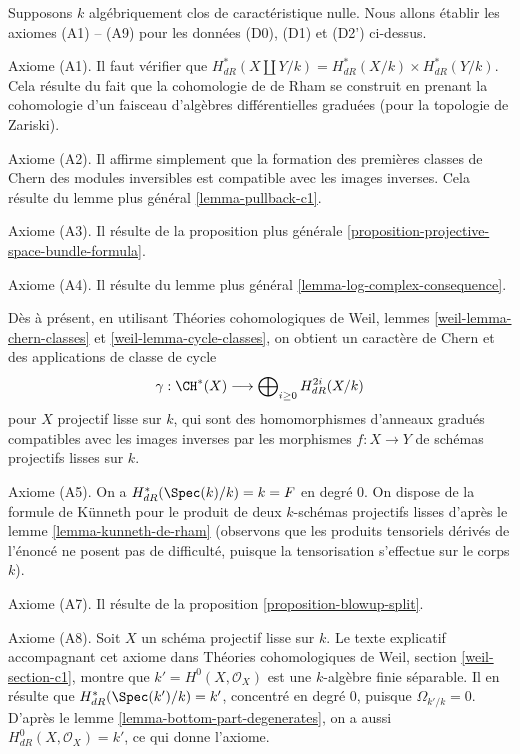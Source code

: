 \medskip\noindent
Supposons $k$ algébriquement clos de caractéristique nulle.
Nous allons établir les axiomes (A1) -- (A9) pour les données (D0), (D1) et (D2')
ci-dessus.

\medskip\noindent
Axiome (A1). Il faut vérifier que
$H^*_{dR}(X \coprod Y/k) =  H^*_{dR}(X/k) \times H^*_{dR}(Y/k)$.
Cela résulte du fait que la cohomologie de de Rham
se construit en prenant la cohomologie d'un faisceau d'algèbres différentielles
graduées (pour la topologie de Zariski).

\medskip\noindent
Axiome (A2). Il affirme simplement que la formation des premières classes
de Chern des modules inversibles est compatible avec les images inverses.
Cela résulte du lemme plus général \ref{lemma-pullback-c1}.

\medskip\noindent
Axiome (A3). Il résulte de la proposition
plus générale \ref{proposition-projective-space-bundle-formula}.

\medskip\noindent
Axiome (A4). Il résulte du lemme
plus général \ref{lemma-log-complex-consequence}.

\medskip\noindent
Dès à présent, en utilisant
Théories cohomologiques de Weil, lemmes \ref{weil-lemma-chern-classes} et
\ref{weil-lemma-cycle-classes}, on obtient un caractère de Chern et des
applications de classe de cycle
$$
\gamma :
\CH^*(X)
\longrightarrow
\bigoplus\nolimits_{i \geq 0} H^{2i}_{dR}(X/k)
$$
pour $X$ projectif lisse sur $k$, qui sont des homomorphismes d'anneaux gradués
compatibles avec les images inverses par les morphismes $f : X \to Y$
de schémas projectifs lisses sur $k$.

\medskip\noindent
Axiome (A5). On a $H_{dR}^*(\Spec(k)/k) = k = F$ en degré $0$.
On dispose de la formule de K\"unneth pour le produit de deux
$k$-schémas projectifs lisses d'après le lemme \ref{lemma-kunneth-de-rham} (observons que les
produits tensoriels dérivés de l'énoncé ne posent pas de difficulté, puisque la
tensorisation s'effectue sur le corps $k$).

\medskip\noindent
Axiome (A7). Il résulte de la proposition \ref{proposition-blowup-split}.

\medskip\noindent
Axiome (A8). Soit $X$ un schéma projectif lisse sur $k$.
Le texte explicatif accompagnant cet axiome dans
Théories cohomologiques de Weil, section \ref{weil-section-c1},
montre que $k' = H^0(X, \mathcal{O}_X)$ est une
$k$-algèbre finie séparable. Il en résulte que $H_{dR}^*(\Spec(k')/k) = k'$,
concentré en degré $0$, puisque $\Omega_{k'/k} = 0$. D'après
le lemme \ref{lemma-bottom-part-degenerates},
on a aussi $H_{dR}^0(X, \mathcal{O}_X) = k'$, ce qui donne
l'axiome.

